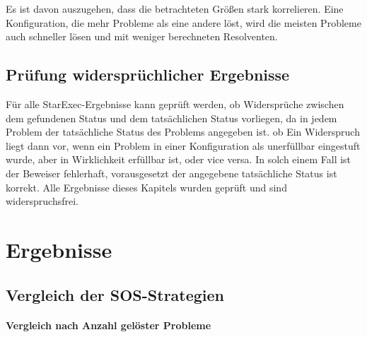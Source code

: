 	Es ist davon auszugehen, dass die betrachteten Größen stark korrelieren. Eine Konfiguration, die mehr Probleme als eine andere löst, wird die meisten Probleme auch schneller lösen und mit weniger berechneten Resolventen.
	
	\subsection{Prüfung widersprüchlicher Ergebnisse}
		Für alle StarExec-Ergebnisse kann geprüft werden, ob Widersprüche zwischen dem gefundenen Status und dem tatsächlichen Status vorliegen, da in jedem Problem der tatsächliche Status des Problems angegeben ist. ob  Ein Widerspruch liegt dann vor, wenn ein Problem in einer Konfiguration als unerfüllbar eingestuft wurde, aber in Wirklichkeit erfüllbar ist, oder vice versa. In solch einem Fall ist der Beweiser fehlerhaft, vorausgesetzt der angegebene tatsächliche Status ist korrekt. Alle Ergebnisse dieses Kapitels wurden geprüft und sind widerspruchsfrei.

\section{Ergebnisse}
	\subsection{Vergleich der SOS-Strategien}
	\label{section:vglSOS}
		\paragraph{Vergleich nach Anzahl gelöster Probleme}
		
